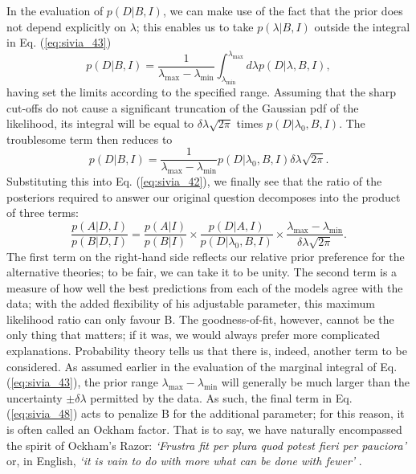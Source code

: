 \documentclass[%
oneside,                 %
final,                   %
10pt]{article}
\begin{document}
In the evaluation of $p(D | B , I )$, we can make use of the fact that the prior does not depend explicitly on $\lambda$; this enables us to take $p(\lambda|B,I)$ outside the integral in Eq. (\ref{eq:sivia_43})
\begin{equation}
p(D|B,I) = \frac{1}{\lambda_\mathrm{max} - \lambda_\mathrm{min}} \int_{\lambda_\mathrm{min}}^{\lambda_\mathrm{max}} d\lambda
p(D|\lambda,B,I),
\label{eq:sivia_46}
\end{equation}
having set the limits according to the specified range. Assuming that the sharp cut-offs
do not cause a significant truncation of the Gaussian pdf of the likelihood,
its integral will be equal to $\delta\lambda \sqrt{2\pi}$ times $p(D|\lambda_0,B,I)$. The troublesome term then reduces to
$$
p(D|B,I) = \frac{1}{\lambda_\mathrm{max} - \lambda_\mathrm{min}} p(D|\lambda_0,B,I) \delta\lambda \sqrt{2\pi}.
$$
Substituting this into Eq. (\ref{eq:sivia_42}), we finally see that the ratio of the posteriors required to answer our original question decomposes into the product of three terms:
\begin{equation}
\frac{p(A|D,I)}{p(B|D,I)} =  \frac{p(A|I)}{p(B|I)} \times \frac{p(D|A,I)}{p(D|\lambda_0,B,I)} \times \frac{\lambda_\mathrm{max} - \lambda_\mathrm{min}}{\delta\lambda \sqrt{2\pi}}. 
\label{eq:sivia_48}
\end{equation}
The first term on the right-hand side reflects our relative prior preference for the alternative theories; to be fair, we can take it to be unity. The second term is a measure of how well the best predictions from each of the models agree with the data; with the added flexibility of his adjustable parameter, this maximum likelihood ratio can only favour B. The goodness-of-fit, however, cannot be the only thing that matters; if it was, we would always prefer more complicated explanations. Probability theory tells us that there is, indeed, another term to be considered. As assumed earlier in the evaluation of the marginal integral of Eq. (\ref{eq:sivia_43}), the prior range $\lambda_\mathrm{max} - \lambda_\mathrm{min}$ will generally be much larger than the uncertainty $\pm\delta\lambda$ permitted by the data. As such, the final term in Eq. (\ref{eq:sivia_48}) acts to penalize B for the additional parameter; for this reason, it is often called an Ockham factor. That is to say, we have naturally encompassed the spirit of Ockham’s Razor: \emph{‘Frustra fit per plura quod potest fieri per pauciora’} or, in English, \emph{‘it is vain to do with more what can be done with fewer’} .
\end{document}
